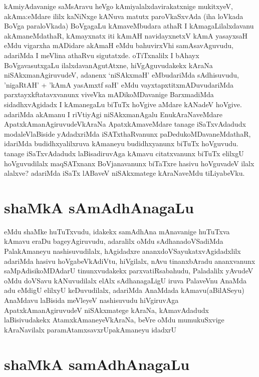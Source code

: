 \begin{artha}
kAmiyAdavanige saMsAravu heVgo kAmiyalalxdavirakatxnige mukitxyeV, akAma:eMdare ililx kaNiNxge kANuva matutx paroVkaSxvAda (iha loVkada BoVga paraloVkada) BoVgagaLu kAmaveMbudara athaR I kAmagaLilalxdavanu akAmaneMdathaR, kAmayxnatx iti kAmAH navidayxnetxV kAmA yasayxsaH eMdu vigarxha mADidare akAmaH eMdu bahuvirxVhi samAsavAguvudu, adariMda I meVlina athaRvu sigutatxde. oTiTxnalilx I bAhayx BoVgavasutxgaLu ilalxdavanAgutAtxne, hiVgAguvudakekx kAraNa niSAkxmanAgiruvudeV, adanenx `niSAkxmaH' eMbudariMda sAdhisuvudu, 'nigaRtAH' + 'kAmA yasAmxtf saH' eMdu vayxtapxtitxmADuvudariMda parxtayxkftatavxvanunx viveVka mADikoMDavanige BarxmadiMda sidadhxvAgidadx I kAmanegaLu biTuTx hoVgive aMdare kANadeV hoVgive. adariMda akAmanu I riVtiyAgi niSAkxmanAgalu EnukAraNaveMdare ApatxkAmanAgiruvudeVkAraNa ApatxkAmaveMdare tanage iSaTxvAdadudx modaleVlaBiside yAdadxriMda iSATxthaRvanunx paDedukoMDavaneMdathaR, idariMda budidhxyalilxruva kAmaneyu budidhxyanunx biTuTx hoVguvudu. tanage iSaTxvAdadudx laBisadiruvAga kAmavu citatxvanunx biTuTx elilxgU hoVguvudilalx maqSATxnanx BoVjanavanunx biTaTxre hasivu hoVguvadeV ilalx alalxve? adariMda iSaTx lABaveV niSAkxmatege kAraNaveMdu tiLiyabeVku.
\end{artha}

\section*{shaMkA sAmAdhAnagaLu}
\begin{artha}
eMdu shaMke huTuTxvudu, idakekx samAdhAna mAnavanige huTuTxva kAmavu eraDu bageyAgiruvudu, adaralilx oMdu sAdhanadoVSadiMda PalakAmaneyu nashisuvudilalx, hAgidadxre ananxdoVSayukatxvAgidadxlilx adariMda hasivu hoVgabeVkAdiVtu, hiVgilalx, nAvu tinanxbAradu ananxvanunx saMpAdisikoMDAdarU tinunxvudakekx parxvatiRsabahudu, Paladalilx yAvudeV oMdu doVSavu kANuvudilalx elAlx sAdhanagaLigU iruva PalaveVnu AnaMda adu eMdigU elilxyU keDuvudilalx, adariMda AnaMdada kAmavu(aBilASeyu) AnaMdavu laBisida meVleyeV nashisuvudu hiVgiruvAga ApatxkAmanAgiruvudeV niSAkxmatege kAraNa, kAmavAdadudx laBisivudakekx AtamxkAmaneyeVkAraNa, beVre oMdu mumukuSxvige kAraNavilalx paramAtamxsavxrUpakAmaneyu idadxrU  
\end{artha}

\section*{shaMkA samAdhAnagaLu} 

